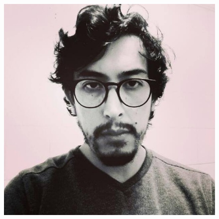 \documentclass[a4paper,12pt,final]{memoir}
\begin{document}
%
\begin{figure}
	\includegraphics[width=0.75\columnwidth]{my-pic.jpg}
	\vspace{-2cm}
\end{figure}
\end{document}
